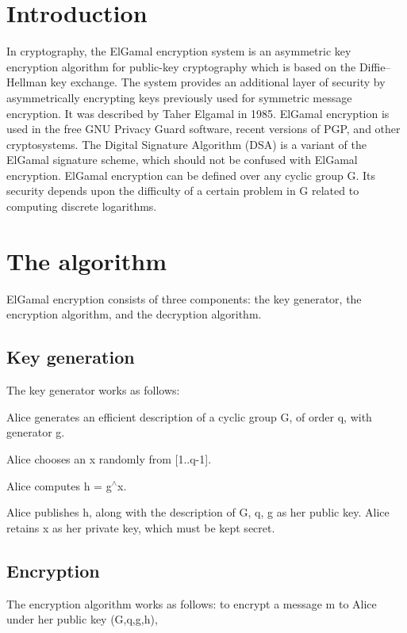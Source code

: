 \hypertarget{index_intro_sec}{}\section{Introduction}\label{index_intro_sec}
In cryptography, the El\+Gamal encryption system is an asymmetric key encryption algorithm for public-\/key cryptography which is based on the Diffie–\+Hellman key exchange. The system provides an additional layer of security by asymmetrically encrypting keys previously used for symmetric message encryption. It was described by Taher Elgamal in 1985. El\+Gamal encryption is used in the free G\+NU Privacy Guard software, recent versions of P\+GP, and other cryptosystems. The Digital Signature Algorithm (D\+SA) is a variant of the El\+Gamal signature scheme, which should not be confused with El\+Gamal encryption. El\+Gamal encryption can be defined over any cyclic group G. Its security depends upon the difficulty of a certain problem in G related to computing discrete logarithms.\hypertarget{index_install_sec}{}\section{The algorithm}\label{index_install_sec}
El\+Gamal encryption consists of three components\+: the key generator, the encryption algorithm, and the decryption algorithm.\hypertarget{index_key_generation}{}\subsection{Key generation}\label{index_key_generation}
The key generator works as follows\+:


\begin{DoxyItemize}
\item Alice generates an efficient description of a cyclic group G, of order q, with generator g.
\item Alice chooses an x randomly from \mbox{[}1..q-\/1\mbox{]}.
\item Alice computes h = g$^\wedge$x.
\item Alice publishes h, along with the description of G, q, g as her public key. Alice retains x as her private key, which must be kept secret.
\end{DoxyItemize}\hypertarget{index_encryption}{}\subsection{Encryption}\label{index_encryption}
The encryption algorithm works as follows\+: to encrypt a message m to Alice under her public key (G,q,g,h),


